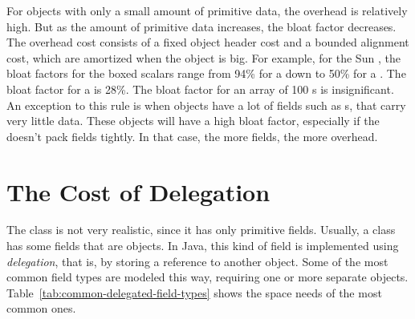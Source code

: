 
For objects with only a small amount of primitive data, the overhead is relatively high. 
But as the amount of primitive data increases, the bloat factor decreases. 
The overhead cost consists of a fixed object header cost and a bounded alignment cost,
which are amortized when the object is big.  For example, for the Sun \jre, the bloat factors for the boxed
scalars range from 94\% for a  down to 50\% for a
.  The bloat factor for a  is 28\%.  The
bloat factor for an array of 100 s is insignificant.  
An exception to this rule is when objects
have a lot of fields such as s, that carry very little data. 
These objects will have a high bloat factor, especially if the \jre doesn't pack
fields tightly. In that case, the more fields, the more overhead.

\section{The Cost of Delegation}

The  class is not very realistic, since it has only
primitive fields. Usually, a class has some fields that are objects. In Java,
this kind of field is implemented using
\textit{delegation}, that is, by storing a reference to another object. 
Some of the most common field types are modeled this way, requiring one or more
separate objects. Table~\ref{tab:common-delegated-field-types} shows the space
needs of the most common ones.


